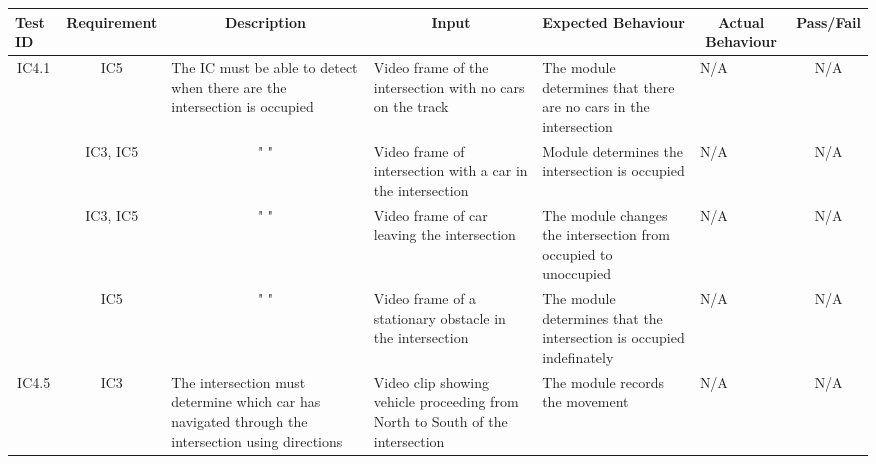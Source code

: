 \documentclass [10pt]{article}
\begin{document}
    
  \begin{longtable}{ | p{ } | p{ } |  p{ } |  p{ } | p{ } | p{ } |  p{ } |}  \hline

    \rowcolor{subsectionC}\textbf{Test ID}
    & \multicolumn{1}{c|}{\textbf{Requirement} }
    &\multicolumn{1}{c|}{\textbf{Description} }
    & \multicolumn{1}{c|}{\textbf{Input} }
    & \textbf{Expected Behaviour} 
    & \multicolumn{1}{c|}{\textbf{Actual Behaviour} }
    & \multicolumn{1}{c|}{\textbf{Pass/Fail}} \\  \hline
    
    \multicolumn{1}{|c|}{IC4.1} 
    &\multicolumn{1}{c|}{IC5}  
    & The IC must be able to detect when there are the intersection is occupied
    & Video frame of the intersection with no cars on the track
    & The module determines that there are no cars in the intersection  
    & N/A
    &\multicolumn{1}{c|}{N/A}\\ \hline
    
    \rowcolor{tableCell}\multicolumn{1}{|c|}{IC4.2} 
    &\multicolumn{1}{c|}{IC3, IC5} 
    & \multicolumn{1}{c|}{" "} 
    & Video frame of intersection with a car in the intersection
    & Module determines the intersection is occupied
    & N/A
    & \multicolumn{1}{c|}{N/A}\\ \hline
    
    \newpage\hline
    
    \multicolumn{1}{|c|}{IC4.3} 
    &\multicolumn{1}{c|}{IC3, IC5}
    & \multicolumn{1}{c|}{" "} 
    & Video frame of car leaving the intersection
    & The module changes the intersection from occupied to unoccupied
    & N/A
    & \multicolumn{1}{c|}{N/A}\\ \hline
    
    \rowcolor{tableCell}\multicolumn{1}{|c|}{IC4.4} 
        &\multicolumn{1}{c|}{IC5}  
    &\multicolumn{1}{c|}{" "} 
    & Video frame of a stationary obstacle in the intersection
    & The module determines that the intersection is occupied indefinately
    & N/A
    & \multicolumn{1}{c|}{N/A}\\ \hline
    
    \multicolumn{1}{|c|}{IC4.5} 
    &\multicolumn{1}{c|}{IC3}
    & The intersection must determine which car has navigated through the intersection using directions
    & Video clip showing vehicle proceeding from North to South of the intersection
    & The module records the movement 
    & N/A
    & \multicolumn{1}{c|}{N/A} \\\hline
    

\end{longtable}
\end{document}
